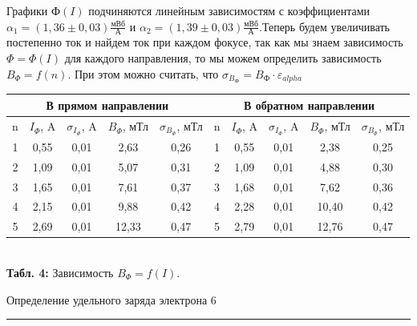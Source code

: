 \documentclass[12pt,a4paper]{scrartcl}
\begin{document}
Графики $\text{Ф}(I)$ подчиняются линейным зависимостям с коэффициентами $\alpha_1 = (1,36 \pm 0,03) \frac{\text{мВб}}{\text{А}}$ и $\alpha_2 = (1,39 \pm 0,03) \frac{\text{мВб}}{\text{А}}$.Теперь будем увеличивать постепенно ток и найдем ток при каждом фокусе, так как мы знаем зависимость $\Phi = \Phi(I)$ для каждого направления, то мы можем определить зависимость $B_{\Phi} = f(n)$. При этом можно считать, что $\sigma_{B_{\text{Ф}}} = B_{\text{Ф}} \cdot \varepsilon_{alpha}$
\begin{center}
\begin{tabular}{|c|c|c|c|c|c|c|c|c|c|}
\hline
\multicolumn{5}{|c|}{В прямом направлении} & \multicolumn{5}{c|}{В обратном направлении} \\ \hline
n & $I_{\Phi}$, A & $\sigma_{I_{\Phi}}$, A & $B_{\Phi}$, мТл & $\sigma_{B_{\Phi}}$, мТл & n & $I_{\Phi}$, A & $\sigma_{I_{\Phi}}$, A & $B_{\Phi}$, мТл & $\sigma_{B_{\Phi}}$, мТл \\ \hline
1 & 0,55 & 0,01 & 2,63 & 0,26 & 1 & 0,55 & 0,01 & 2,38 & 0,25 \\ \hline
2 & 1,09 & 0,01 & 5,07 & 0,31 & 2 & 1,09 & 0,01 & 4,88 & 0,30 \\ \hline
3 & 1,65 & 0,01 & 7,61 & 0,37 & 3 & 1,68 & 0,01 & 7,62 & 0,36 \\ \hline
4 & 2,15 & 0,01 & 9,88 & 0,42 & 4 & 2,28 & 0,01 & 10,40 & 0,42 \\ \hline
5 & 2,69 & 0,01 & 12,33 & 0,47 & 5 & 2,79 & 0,01 & 12,76 & 0,47 \\ \hline
\end{tabular}\\
\textbf{Табл. 4:} Зависимость $B_{\Phi} = f(I)$.
\end{center}  
  
 	\newpage
	
	\begin{flushleft}
		\footnotesize{Определение удельного заряда электрона} \hspace{\fill} \footnotesize{6}
		\\[-0.3cm]\noindent\rule{\textwidth}{0.3pt}
	\end{flushleft} 
  
\end{document}
